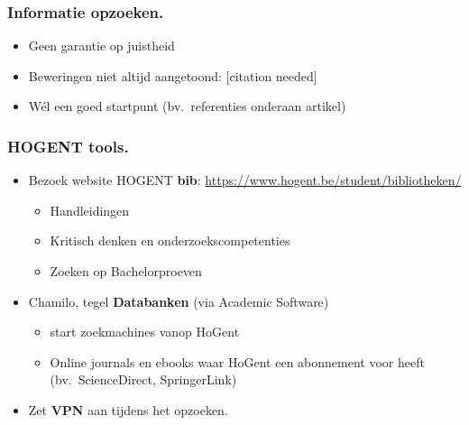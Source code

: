 \documentclass[aspectratio=169]{beamer}
\begin{document}
\begin{frame}
  \frametitle{Informatie opzoeken.}


  {\pause}

  \begin{itemize}
    \item Geen garantie op juistheid
    \item Beweringen niet altijd aangetoond: [citation needed]
    \item \alert{Wél} een goed startpunt (bv.\ referenties onderaan artikel)
  \end{itemize}
\end{frame}

\begin{frame}
  \frametitle{HOGENT tools.}

  \begin{itemize}
    \item<+-> Bezoek website HOGENT \textbf{bib}: \url{https://www.hogent.be/student/bibliotheken/}
    \begin{itemize}
      \item Handleidingen
      \item Kritisch denken en onderzoekscompetenties
      \item Zoeken op Bachelorproeven
    \end{itemize}
    \item<+-> Chamilo, tegel \textbf{Databanken} (via Academic Software)
    \begin{itemize}
      \item start zoekmachines vanop HoGent
      \item Online journals en ebooks waar HoGent een abonnement voor heeft (bv.~ScienceDirect, SpringerLink)
    \end{itemize}
    \item<+-> Zet \textbf{VPN} aan tijdens het opzoeken.
  \end{itemize}
\end{frame}
\end{document}
